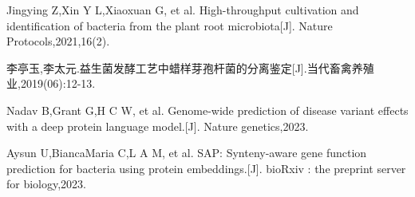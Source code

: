 \documentclass{ctexart}
\begin{document}
    \begin{thebibliography}{99}
         Jingying Z,Xin Y L,Xiaoxuan G, et al. High-throughput cultivation and identification of bacteria from the plant root microbiota[J]. Nature Protocols,2021,16(2).

         李亭玉,李太元.益生菌发酵工艺中蜡样芽孢杆菌的分离鉴定[J].当代畜禽养殖业,2019(06):12-13.
 
         Nadav B,Grant G,H C W, et al. Genome-wide prediction of disease variant effects with a deep protein language model.[J]. Nature genetics,2023.

         Aysun U,BiancaMaria C,L A M, et al. SAP: Synteny-aware gene function prediction for bacteria using protein embeddings.[J]. bioRxiv : the preprint server for biology,2023.
    \end{thebibliography}
\end{document}
